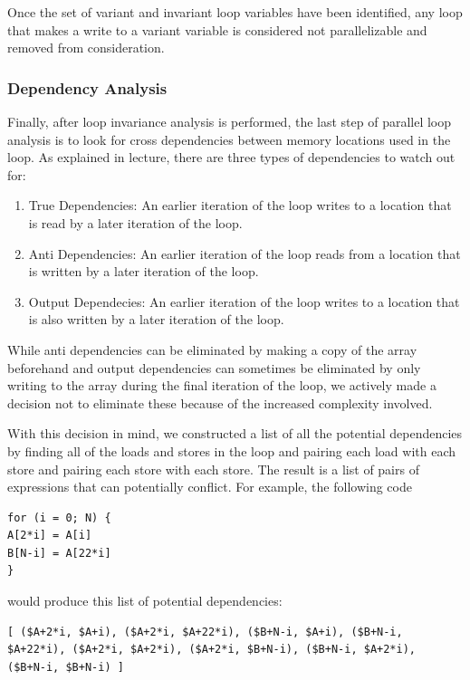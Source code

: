 \documentclass[11pt]{article}
\begin{document}
Once the set of variant and invariant loop variables have been
identified, any loop that makes a write to a variant variable is
considered not parallelizable and removed from consideration. 

\subsubsection {Dependency Analysis}

Finally, after loop invariance analysis is performed, the last step of
parallel loop analysis is to look for cross dependencies between
memory locations used in the loop. As explained in lecture, there are three
types of dependencies to watch out for: 

\begin{enumerate} 

\item True Dependencies: An earlier iteration of the loop writes
  to a location that is read by a later iteration of the loop. 

\item Anti Dependencies: An earlier iteration of the loop reads from a
  location  that is written by a later iteration of the loop. 

\item Output Dependecies: An earlier iteration of the loop writes to a
  location that is also written by a later iteration of the loop. 

\end{enumerate} 

While anti dependencies can be eliminated by making a copy of the
array beforehand and output dependencies can sometimes be eliminated
by only writing to the array during the final iteration of the loop,
we actively made a decision not to eliminate these because of the increased
complexity involved. 

With this decision in mind, we constructed a list of all the potential
dependencies by finding all of the loads and stores in the loop and
pairing each load with each store and pairing each store with each
store. The result is a list of pairs of expressions that can
potentially conflict. For example, the following code 
\begin{verbatim}
for (i = 0; N) { 
A[2*i] = A[i]
B[N-i] = A[22*i]
}
\end{verbatim}
would produce this list of potential dependencies: 
\begin{verbatim}
[ ($A+2*i, $A+i), ($A+2*i, $A+22*i), ($B+N-i, $A+i), ($B+N-i,
$A+22*i), ($A+2*i, $A+2*i), ($A+2*i, $B+N-i), ($B+N-i, $A+2*i),
($B+N-i, $B+N-i) ]
\end{verbatim}
\end{document}
